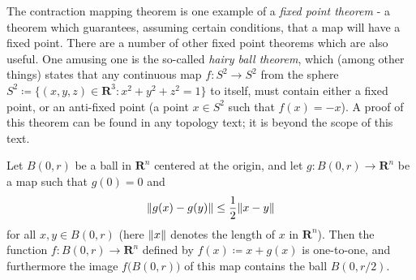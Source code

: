 \begin{remark}\label{6.6.5}
    The contraction mapping theorem is one example of a \emph{fixed point theorem}
    - a theorem which guarantees, assuming certain conditions, that a map will have a fixed point.
    There are a number of other fixed point theorems which are also useful.
    One amusing one is the so-called \emph{hairy ball theorem}, which (among other things) states that any continuous map \(f : S^2 \to S^2\) from the sphere \(S^2 \coloneqq \{(x, y, z) \in \mathbf{R}^3 : x^2 + y^2 + z^2 = 1\}\) to itself, must contain either a fixed point, or an anti-fixed point
    (a point \(x \in S^2\) such that \(f(x) = -x\)).
    A proof of this theorem can be found in any topology text;
    it is beyond the scope of this text.
\end{remark}

\begin{lemma}\label{6.6.6}
    Let \(B(0, r)\) be a ball in \(\mathbf{R}^n\) centered at the origin, and let \(g : B(0, r) \to \mathbf{R}^n\) be a map such that \(g(0) = 0\) and
    \[
        \norm*{g(x) - g(y)} \leq \frac{1}{2} \norm*{x - y}
    \]
    for all \(x, y \in B(0, r)\)
    (here \(\norm*{x}\) denotes the length of \(x\) in \(\mathbf{R}^n\)).
    Then the function \(f : B(0, r) \to \mathbf{R}^n\) defined by \(f(x) \coloneqq x + g(x)\) is one-to-one, and furthermore the image \(f\big(B(0, r)\big)\) of this map contains the ball \(B(0, r / 2)\).
\end{lemma}

